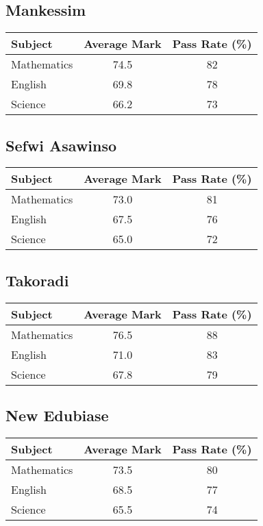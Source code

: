 \documentclass[a4paper,12pt]{article}
\begin{document}
\subsection*{Mankessim}
\begin{tabular}{l S[table-format=2.1] c}
    \toprule
    \textbf{Subject} & \textbf{Average Mark} & \textbf{Pass Rate (\%)} \\
    \midrule
    Mathematics & 74.5 & 82 \\
    English & 69.8 & 78 \\
    Science & 66.2 & 73 \\
    \bottomrule
\end{tabular}

\subsection*{Sefwi Asawinso}
\begin{tabular}{l S[table-format=2.1] c}
    \toprule
    \textbf{Subject} & \textbf{Average Mark} & \textbf{Pass Rate (\%)} \\
    \midrule
    Mathematics & 73.0 & 81 \\
    English & 67.5 & 76 \\
    Science & 65.0 & 72 \\
    \bottomrule
\end{tabular}

\subsection*{Takoradi}
\begin{tabular}{l S[table-format=2.1] c}
    \toprule
    \textbf{Subject} & \textbf{Average Mark} & \textbf{Pass Rate (\%)} \\
    \midrule
    Mathematics & 76.5 & 88 \\
    English & 71.0 & 83 \\
    Science & 67.8 & 79 \\
    \bottomrule
\end{tabular}

\subsection*{New Edubiase}
\begin{tabular}{l S[table-format=2.1] c}
    \toprule
    \textbf{Subject} & \textbf{Average Mark} & \textbf{Pass Rate (\%)} \\
    \midrule
    Mathematics & 73.5 & 80 \\
    English & 68.5 & 77 \\
    Science & 65.5 & 74 \\
    \bottomrule
\end{tabular}
\end{document}
